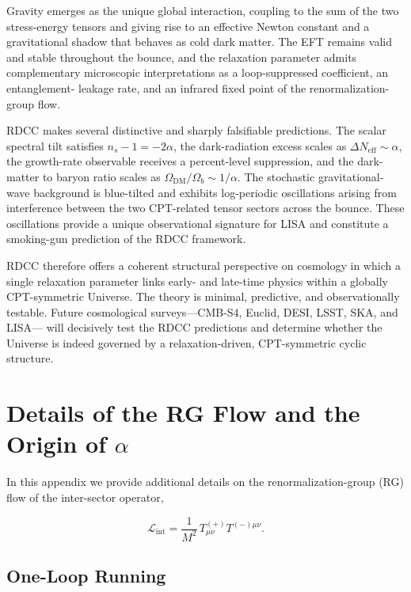 \documentclass[11pt,a4paper]{article}
\begin{document}
Gravity emerges as the unique global interaction, coupling to the sum of the two
stress-energy tensors and giving rise to an effective Newton constant and a
gravitational shadow that behaves as cold dark matter. The EFT remains valid and
stable throughout the bounce, and the relaxation parameter admits complementary
microscopic interpretations as a loop-suppressed coefficient, an entanglement-
leakage rate, and an infrared fixed point of the renormalization-group flow.

RDCC makes several distinctive and sharply falsifiable predictions. The scalar
spectral tilt satisfies \(n_{s} - 1 = -2\alpha\), the dark-radiation excess scales
as \(\Delta N_{\mathrm{eff}} \sim \alpha\), the growth-rate observable receives a
percent-level suppression, and the dark-matter to baryon ratio scales as
\(\Omega_{\mathrm{DM}}/\Omega_{b} \sim 1/\alpha\). The stochastic gravitational-wave
background is blue-tilted and exhibits log-periodic oscillations arising from
interference between the two CPT-related tensor sectors across the bounce. These
oscillations provide a unique observational signature for LISA and constitute a
smoking-gun prediction of the RDCC framework.

RDCC therefore offers a coherent structural perspective on cosmology in which a
single relaxation parameter links early- and late-time physics within a globally
CPT-symmetric Universe. The theory is minimal, predictive, and observationally
testable. Future cosmological surveys—CMB-S4, Euclid, DESI, LSST, SKA, and LISA—
will decisively test the RDCC predictions and determine whether the Universe is
indeed governed by a relaxation-driven, CPT-symmetric cyclic structure.

\clearpage

\appendix

\section{Details of the RG Flow and the Origin of \texorpdfstring{$\alpha$}{alpha}}
\label{app:RG}

In this appendix we provide additional details on the renormalization-group (RG)
flow of the inter-sector operator,

\[
\mathcal{L}_{\mathrm{int}}
    = \frac{1}{M^{2}}\,T^{(+)}_{\mu\nu} T^{(-)\mu\nu}.
\]

\subsection{One-Loop Running}
\end{document}

